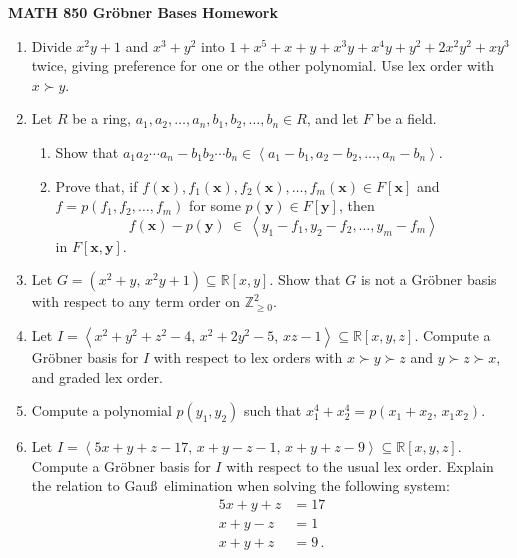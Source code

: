 \documentclass[11pt]{article}
\newcommand\gen[1]{\left< #1 \right>}
\def\Z{\mathbb{Z}}
\def\R{\mathbb{R}}
\def\x{\mathbf{x}}
\def\y{\mathbf{y}}
\begin{document}
\setlength{\parindent}{0pt}
\setlength{\parskip}{0.4cm}

\thispagestyle{empty} 

\begin{center} {\bf MATH 850 \qquad \qquad Gr\"obner Bases Homework} \end{center} 

\begin{enumerate}[(1)]

\item Divide $x^2 y + 1$ and $x^3 + y^2$ into $1 + x^5 + x + y + x^3 y + x^4 y + y^2 + 2 x^2 y^2 + x y^3$ twice, giving preference for one or
the other polynomial. Use lex order with $x \succ y$.

\item Let $R$ be a ring, $a_1, a_2, \dots, a_n, b_1, b_2, \dots, b_n \in R$, and let $F$ be a field.
  \begin{enumerate}
  \item Show that $a_1 a_2 \cdots a_n - b_1 b_2 \cdots b_n \in \gen{ a_1 - b_1, a_2 - b_2, \dots, a_n - b_n }$.
  \item Prove that, if $f(\x), f_1(\x), f_2(\x), \dots, f_m(\x) \in F[\x]$ and $f = p(f_1, f_2, \dots, f_m)$ for some $p(\y) \in F[\y]$, then
  \[
    f(\x) - p(\y) \ \in \ \gen{ y_1 - f_1, y_2 - f_2, \dots, y_m - f_m }
  \]
  in $F[\x, \y]$.
  \end{enumerate}

\item Let $G = \left( x^2 + y, \, x^2 y + 1 \right) \subseteq \R[x,y]$. Show that $G$ is not a Gr\"obner basis with respect to any term order
on $\Z_{ \ge 0 }^2$.

\item Let $I = \gen{ x^2 + y^2 + z^2 - 4, \, x^2 + 2 y^2 - 5, \, xz - 1 } \subseteq \R[x,y,z]$. Compute a Gr\"obner basis for $I$ with
respect to lex orders with $x \succ y \succ z$ and $y \succ z \succ x$, and graded lex order.

\item Compute a polynomial $p(y_1, y_2)$ such that $x_1^4 + x_2^4 = p(x_1+x_2, \, x_1 x_2)$.

\item Let $I = \gen{ 5x + y + z - 17, \, x+y-z-1, \, x+y+z-9 } \subseteq \R[x,y,z]$. Compute a Gr\"obner basis for $I$ with respect to the
usual lex order. Explain the relation to Gau\ss \ elimination when solving the following system:
\begin{align*}
  5x + y + z &= 17 \\
  x+y-z &= 1 \\
  x+y+z &= 9 \, .
\end{align*}


\end{enumerate}
\end{document}
